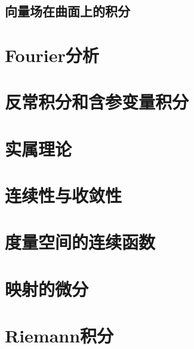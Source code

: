 \documentclass[lang=cn,10pt]{elegantbook}
\begin{document}
\section{向量场在曲面上的积分}



\chapter{Fourier分析}
\chapter{反常积分和含参变量积分}
\chapter{实属理论}

\chapter{连续性与收敛性}
\chapter{度量空间的连续函数}
\chapter{映射的微分}
\chapter{Riemann积分}
\end{document}
